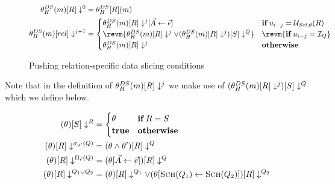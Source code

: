 \begin{figure*}[t]
  \centering
\begin{align}
  \label{eq:pushing-queries-multi-rel}
  \mpushCond{\condDSh{\modi}}{0}{\rel}                                                 & = \mcondDSh{\modi}{\rel}                            \\
  \mpushCond{\condDSh{\modi}}{j+1}{rel}                                               & =
                                                                                        \begin{cases}
                                                                                          \subst{\mpushCond{\condDSh{\modi}}{j}{\rel}}{\vec{A}}{\vec{e}} & \mathbf{if}\, \up_{i-j} = \update{\pset}{\cond}(\rel) \\
                                                                                          \revm{\mpushCond{\condDSh{\modi}}{j}{\rel} \lor \mqpushCond{\mpushCond{\condDSh{\modi}}{j}{\rel}}{\query}{S}} &\revm{\mathbf{if}\, \up_{i-j} = \aqinsert}\\
                                                                                          \mpushCond{\condDSh{\modi}}{j}{\rel}             & \mathbf{otherwise}                           \\
                                                                                        \end{cases}
\end{align}
  \caption{Pushing relation-specific data slicing conditions}\label{fig:pushing-relation-specific}
\end{figure*}

Note that in the definition of $\mpushCond{\condDSh{\modi}}{j}{\rel}$ we make use of $\mqpushCond{\mpushCond{\condDSh{\modi}}{j}{\rel}}{\query}{S}$ which we define below. %

  \begin{align*}
    \mqpushCond{\cond}{R}{S} &=
                               \begin{cases}
                                 \cond &\mathbf{if}\, R = S\\
                                 \T &\mathbf{otherwise}
                               \end{cases}\\
    \mqpushCond{\cond}{\selection_{\cond'}(\query)}{\rel} &= \mqpushCond{\cond \land \cond'}{\query}{\rel}\\
    \mqpushCond{\cond}{\projection_{\vec{e}}(\query)}{\rel} &= \mqpushCond{\cond[\vec{A} \gets \vec{e}]}{\query}{\rel}\\
    \mqpushCond{\cond}{\query_1 \union \query_2}{\rel} &= \mqpushCond{\cond}{\query_1}{\rel} \lor \mqpushCond{\cond[\schema{\query_1} \gets \schema{\query_2}]}{\query_2}{\rel}\\
  \end{align*}



